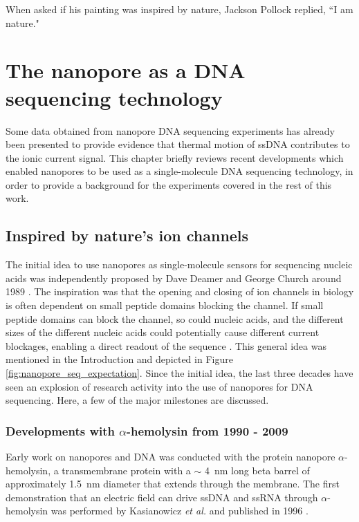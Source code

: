 \begin{savequote}[75mm]
When asked if his painting was inspired by nature, Jackson Pollock replied, ``I am nature."
\end{savequote}

\chapter{The nanopore as a DNA sequencing technology}
\label{dna_sequencing}

Some data obtained from nanopore DNA sequencing experiments has already been presented to provide evidence that thermal motion of ssDNA contributes to the ionic current signal.  This chapter briefly reviews recent developments which enabled nanopores to be used as a single-molecule DNA sequencing technology, in order to provide a background for the experiments covered in the rest of this work.

\section{Inspired by nature's ion channels}

The initial idea to use nanopores as single-molecule sensors for sequencing nucleic acids was independently proposed by Dave Deamer and George Church around 1989 \citep{Deamer2016,Branton2008}.  The inspiration was that the opening and closing of ion channels in biology is often dependent on small peptide domains blocking the channel.  If small peptide domains can block the channel, so could nucleic acids, and the different sizes of the different nucleic acids could potentially cause different current blockages, enabling a direct readout of the sequence \citep{Branton2008}.  This general idea was mentioned in the Introduction and depicted in Figure \ref{fig:nanopore_seq_expectation}.  Since the initial idea, the last three decades have seen an explosion of research activity into the use of nanopores for DNA sequencing.  Here, a few of the major milestones are discussed.

\subsection{Developments with $\alpha$-hemolysin from 1990 - 2009}

Early work on nanopores and DNA was conducted with the protein nanopore $\alpha$-hemolysin, a transmembrane protein with a $\sim$ \SI{4}{\nm} long beta barrel of approximately \SI{1.5}{\nm} diameter that extends through the membrane.  The first demonstration that an electric field can drive ssDNA and ssRNA through $\alpha$-hemolysin was performed by Kasianowicz \textit{et al.} and published in 1996 \citep{Kasianowicz1996}.

